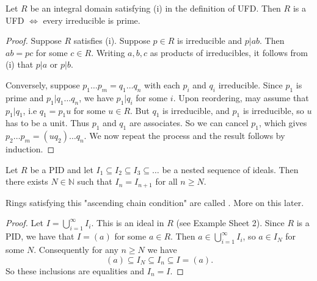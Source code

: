 \documentclass[egregdoesnotlikesansseriftitles,a4paper]{scrartcl}
\begin{document}
\begin{proposition}
       Let $R$ be an integral domain satisfying (i) in the definition of UFD. Then $R$ is a UFD $\iff$ every irreducible is prime.
       \begin{proof}
            Suppose $R$ satisfies (i). Suppose $p \in R$ is irreducible and $p|ab$. Then $ab=pc $ for some $c \in R$. Writing $a,b,c$ as products of irreducibles, it follows from (i) that $p|a$ or $p|b$.
     
            Conversely, suppose $p_1 \ldots p_{m}=q_1 \ldots q_{n}$ with each $p_i$ and $q_i$ irreducible. Since $p_1 $ is prime and $p_1 | q_1 \ldots q_n$, we have $p_1 |q_i$ for some $i$. Upon reordering, may assume that $p_1 | q_1 $, i.e $q_1 =p_1 u$ for some $u \in R$. But $q_1 $ is irreducible, and $p_1 $ is irreducible, so $u$ has to be a unit. Thus $p_1 $ and $q_1 $ are associates. So we can cancel $p_1 $, which gives $p_2 \ldots p_m= (uq_2 )\ldots q_n$. We now repeat the process and the result follows by induction.
     \end{proof}
\end{proposition}
\begin{lemma}\label{PIDsarenoetherian}
       Let $R$ be a PID and let $I_1 \subseteq I_2 \subseteq I_3 \subseteq \ldots$ be a nested sequence of ideals. Then there exists $N \in \mathbb{N}$ such that $I_{n}=I_{n+1}$ for all $n \geq N$.
       \begin{remark}
              Rings satisfying this "ascending chain condition" are called . More on this later.
       \end{remark}
       \begin{proof}
            Let $I=\bigcup_{i=1}^{\infty}I_{i}$. This is an ideal in $R$ (see Example Sheet 2). Since $R$ is a PID, we have that $I=(a)$ for some $a \in R$. Then $a \in \bigcup_{i=1}^{\infty}I_{i}$, so $a \in I_{N}$ for some $N$. Consequently for any $n \geq N$ we have \[
            (a) \subseteq I_{N} \subseteq I_{n} \subseteq I= (a)
            .\] So these inclusions are equalities and $I_{n}=I$.
     \end{proof}
\end{lemma}
\end{document}
